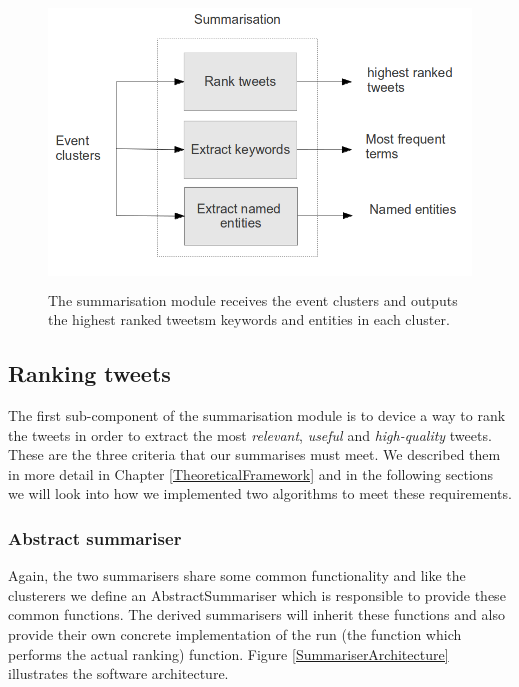 \begin{figure}[!htbp]
  \begin{center}
    \includegraphics[height=3.0in, width=6in]{summarisation-overview}
    \caption{The summarisation module receives the event clusters and outputs the highest ranked tweetsm keywords and entities in each cluster.}
    \label{SummarisationOverview}
  \end{center}
\end{figure} 

\subsection{Ranking tweets}
The first sub-component of the summarisation module is to device a way to rank the tweets in order to extract the most \emph{relevant}, \emph{useful} and \emph{high-quality} tweets. These are the three criteria that our summarises must meet. We described them in more detail in Chapter \ref{TheoreticalFramework} and in the following sections we will look into how we implemented two algorithms to meet these requirements.  

\subsubsection{Abstract summariser}
Again, the two summarisers share some common functionality and like the clusterers we define an AbstractSummariser which is responsible to provide these common functions. The derived summarisers will inherit these functions and also provide their own concrete implementation of the run (the function which performs the actual ranking) function. Figure \ref{SummariserArchitecture} illustrates the software architecture. 

